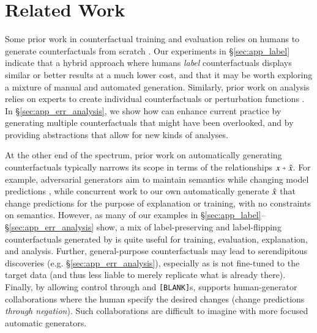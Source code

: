 \section{Related Work}
\label{sec:relate}
Some prior work in counterfactual training and evaluation relies on humans to generate counterfactuals from scratch \cite{gardner2020contrast, teney2020learning, kaushik2019learning}. 
Our experiments in \S\ref{sec:app_label} indicate that a hybrid approach where humans \emph{label} \sysname{} counterfactuals displays similar or better results at a much lower cost, and that it may be worth exploring a mixture of manual and automated generation. 
Similarly, prior work on analysis relies on experts to create individual counterfactuals or perturbation functions \cite{wu2019errudite, checklist:acl20}. 
In \S\ref{sec:app_err_analysis}, we show how \sysname{} can enhance current practice by generating multiple counterfactuals that might have been overlooked, and by providing abstractions that allow for new kinds of analyses.

At the other end of the spectrum, prior work on automatically generating counterfactuals typically narrows its scope in terms of the relationships $x \veryshortarrow \xp$.
For example, adversarial generators aim to maintain semantics while changing model predictions \cite{ribeiro2018semantically, iyyer2018adversarial, alzantot-etal-2018-generating}, while concurrent work to our own \cite{madaan2020generate, ross2020explaining} automatically generate $\hat{x}$ that change predictions for the purpose of explanation or training, with no constraints on semantics.
However, as many of our examples in \S\ref{sec:app_label}--\S\ref{sec:app_err_analysis} show, a mix of label-preserving and label-flipping counterfactuals generated by \sysname{} is quite useful for training, evaluation, explanation, and analysis. 
Further, general-purpose counterfactuals may lead to serendipitous discoveries (e.g. \S\ref{sec:app_err_analysis}), especially as \sysname{} is not fine-tuned to the target data (and thus less liable to merely replicate what is already there).
Finally, by allowing control through \tagstrs and \texttt{[BLANK]}s, \sysname{} supports human-generator collaborations where the human specify the desired changes (\eg change predictions \emph{through negation}).
Such collaborations are difficult to imagine with more focused automatic generators.


